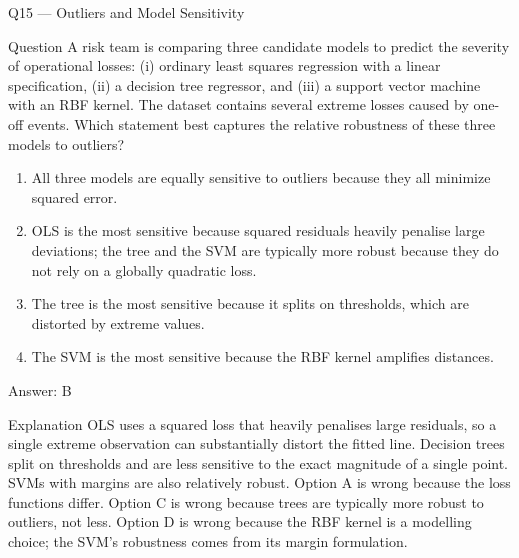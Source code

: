 \documentclass[aspectratio=169,8pt]{beamer}
\begin{document}
	\begin{frame}{Q15 --- Outliers and Model Sensitivity}
		\begin{block}{Question}
			A risk team is comparing three candidate models to predict the severity of operational losses: (i) ordinary least squares regression with a linear specification, (ii) a decision tree regressor, and (iii) a support vector machine with an RBF kernel. The dataset contains several extreme losses caused by one-off events. Which statement best captures the relative robustness of these three models to outliers?
		\end{block}
		\begin{enumerate}
			\item All three models are equally sensitive to outliers because they all minimize squared error.
			\item OLS is the most sensitive because squared residuals heavily penalise large deviations; the tree and the SVM are typically more robust because they do not rely on a globally quadratic loss.
			\item The tree is the most sensitive because it splits on thresholds, which are distorted by extreme values.
			\item The SVM is the most sensitive because the RBF kernel amplifies distances.
		\end{enumerate}
		\begin{exampleblock}{Answer: B}\end{exampleblock}
		\begin{block}{Explanation}
			OLS uses a squared loss that heavily penalises large residuals, so a single extreme observation can substantially distort the fitted line. Decision trees split on thresholds and are less sensitive to the exact magnitude of a single point. SVMs with margins are also relatively robust. Option A is wrong because the loss functions differ. Option C is wrong because trees are typically more robust to outliers, not less. Option D is wrong because the RBF kernel is a modelling choice; the SVM's robustness comes from its margin formulation.
		\end{block}
	\end{frame}
	
\end{document}
